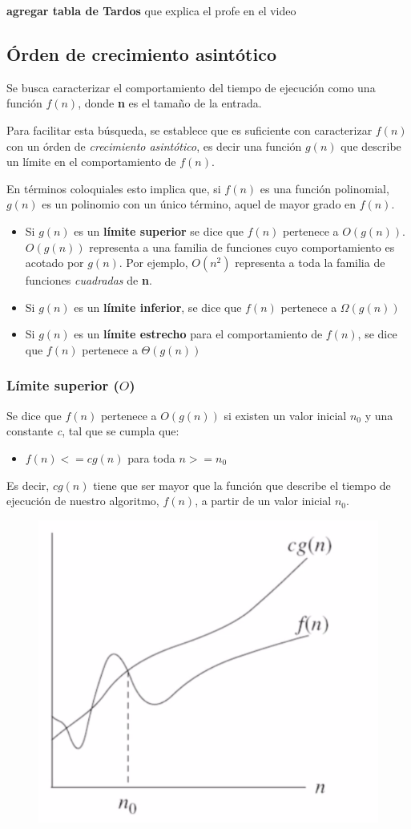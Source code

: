 \documentclass[letterpaper, 12pt]{article}
\begin{document}
\textbf{agregar tabla de Tardos} que explica el profe en el video
\subsection{Órden de crecimiento asintótico}
\label{sec:orgc4f0496}
Se busca caracterizar el comportamiento del tiempo de ejecución como una función
\(f(n)\), donde \textbf{n} es el tamaño de la entrada.

Para facilitar esta búsqueda, se establece que es suficiente con caracterizar
\(f(n)\) con un órden de \emph{crecimiento asintótico}, es decir una función \(g(n)\) que
describe un límite en el comportamiento de \(f(n)\).

En términos coloquiales esto implica que, si \(f(n)\) es una función polinomial,
\(g(n)\) es un polinomio con un único término, aquel de mayor grado en \(f(n)\).
\begin{itemize}
\item Si \(g(n)\) es un \textbf{límite superior} se dice que \(f(n)\) pertenece a \(O(g(n))\).
\(O(g(n))\) representa a una familia de funciones cuyo comportamiento es acotado
por \(g(n)\).
Por ejemplo, \(O(n^2)\) representa a toda la familia de funciones \emph{cuadradas}
de \textbf{n}.
\item Si \(g(n)\) es un \textbf{límite inferior}, se dice que \(f(n)\) pertenece a \(\Omega(g(n))\)
\item Si \(g(n)\) es un \textbf{límite estrecho} para el comportamiento de \(f(n)\), se dice
que \(f(n)\) pertenece a \(\Theta(g(n))\)
\end{itemize}
\subsubsection{Límite superior (\(O\))}
\label{sec:org1c16abc}
Se dice que \(f(n)\) pertenece a \(O(g(n))\) si existen un valor inicial \(n_0\) y una
constante \emph{c}, tal que se cumpla que:
\begin{itemize}
\item \(f(n) <= c g(n)\) para toda \(n >= n_0\)
\end{itemize}

Es decir, \(c g(n)\) tiene que ser mayor que la función que describe el tiempo de
ejecución de nuestro algoritmo, \(f(n)\), a partir de un valor inicial \(n_0\).

\begin{figure}
    \includegraphics[widht=0.7\textwidth, height=0.4\textwidth]
        {./img/limite_superior.png}
\end{figure}
\end{document}
